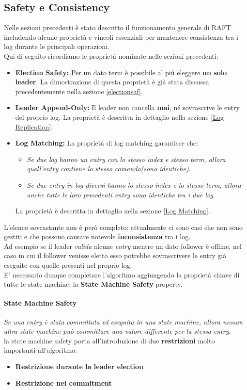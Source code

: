 \subsection{Safety e Consistency}
Nelle sezioni precedenti è stato descritto il funzionamento generale di RAFT includendo alcune proprietà e vincoli essenziali per mantenere consistenza tra i log durante le principali operazioni.\\
Qui di seguito ricordiamo le proprietà nominate nelle sezioni precedenti:

\begin{itemize}
	\item{\textbf{Election Safety:}} 
  Per un dato term è possibile al più eleggere \textbf{un solo leader}.
	La dimostrazione di questa proprietà è già stata discussa precedentemente nella sezione \ref{electionsaf}.
	\item{\textbf{Leader Append-Only:}}
  Il leader non cancella \textbf{mai}, né sovrascrive le entry del proprio log.
  La proprietà è descritta in dettaglio nella sezione \ref{Log Replication}.
	\item{\textbf{Log Matching:}}
  La proprietà di log matching garantisce che:
	\begin{itemize}
		\item{\emph{Se due log hanno un entry con lo stesso index e stesso term, allora quell'entry contiene lo stesso comando(sono identiche)}}.
		\item{\emph{Se due \textit{entry} in log diversi hanno lo stesso index e lo stesso term, allora anche tutte le loro precedenti entry sono identiche tra i due log}}.
	\end{itemize}
	La proprietà è descritta in dettaglio nella sezione \ref{Log Matching}.
\end{itemize}
L'elenco sovrastante non è però completo: attualmente ci sono casi che non sono gestiti e che possono causare notevole \textbf{inconsistenza} tra i log.\\
Ad esempio se il leader \textit{valida} alcune \textit{entry} mentre un dato follower è offline, nel caso in cui il follower venisse eletto esso potrebbe sovrascrivere le entry già eseguite con quelle presenti nel proprio log.\\
E' necessario dunque completare l'algoritmo aggiungendo la proprietà chiave di tutte le state machine: la \textbf{State Machine Safety} property. 

  \paragraph{State Machine Safety}
  \emph{Se una entry è stata committata ed eseguita in una state machine, allora nessun altra state machine può committare una valore differente per la stessa entry}.\\
  la state machine safety porta all'introduzione di due \textbf{restrizioni} molto importanti all'algoritmo:
  \begin{itemize}
    \item{\textbf{Restrizione durante la leader election}}
    \item{\textbf{Restrizione nei commitment}}
  \end{itemize}


